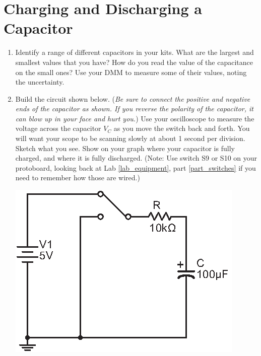 \section{Charging and Discharging a Capacitor}
\label{lab_capacitors}


\bigskip

\begin{enumerate}[wide]

\item Identify a range of different capacitors in your kits.  What are the largest and smallest values that you have? How do you read the value of the capacitance on the small ones?  Use your DMM to measure some of their values, noting the uncertainty. 

\item Build the circuit shown below.  (\textit{Be sure to connect the positive and negative ends of the capacitor as shown.  If you reverse the polarity of the capacitor, it can blow up in your face and hurt you.})  Use your oscilloscope to measure the voltage across the capacitor $V_C$ as you move the switch back and forth.  You will want your scope to be scanning slowly at about 1 second per division.  Sketch what you see.  Show on your graph where your capacitor is fully charged, and where it is fully discharged.  (Note: Use switch S9 or S10 on your protoboard, looking back at Lab \ref{lab_equipment}, part \ref{part_switches} if you need to remember how those are wired.) \label{part_rc_circuit}
\begin{center}
\includegraphics{capacitors/single_dc_capacitor.eps}
\hspace{0.5in}
\end{center}


\end{enumerate}
